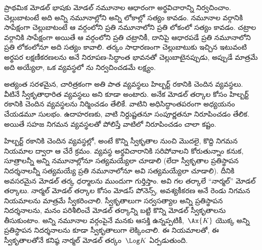 \documentclass[../../../include/open-logic-section]{subfiles}
\begin{document}


ప్రాథమిక మోడల్ భాషకు మోడల్ నమూనాల ఆధారంగా అర్థవిచారాన్ని
నిర్వచించాం.  చెల్లుబాటంటే అది అన్ని
నమూనాల్లోని అన్ని లోకాల్లో సత్యం కావడం. నమూనాల వర్గానికి సాపేక్షంగా
చెల్లుబాటంటే ఆ వర్గంలోని ప్రతి నమూనాలోని ప్రతి లోకంలో సత్యం కావడం.
చట్రాల వర్గానికి సాపేక్షంగా అయితే ఆ వర్గంలోని ప్రతి చట్రానికీ,
దానిపై ఆధారపడే ప్రతి నమూనాలోని ప్రతి లోకంలోనూ అది సత్యం కావాలి.
తర్కం సాధారణంగా చెల్లుబాటుకు ఇచ్చిన ఇటువంటి అర్థపర లక్షణీకరణలను
 అనే నిరూపణ-సిద్ధాంత భావనతో
 చెల్లుబాటైనప్పుడు, అప్పుడే మాత్రమే
అది  అయ్యేలా, ఒక వ్యవస్థలో
ను నిర్వచించడమే లక్ష్యం.

అత్యంత సరళమైన, చారిత్రకంగా అతి పాత 
వ్యవస్థలు హిల్బర్ట్ రకానికి చెందిన  వ్యవస్థలు. వీటినే
స్వీకృతాధారిత వ్యవస్థలు అని కూడా అంటారు. అనేక మోడల్ తర్కాల కోసం హిల్బర్ట్ రకానికి చెందిన
 వ్యవస్థలను నిర్మించడం తేలికే.
వాటిని అధిసిద్ధాంతపరంగా అధ్యయనం చేయడమూ సులభం. ఉదాహరణకు,
వాటి నిర్దుష్టతనూ సంపూర్ణతనూ నిరూపించడం తేలిక. అయితే సహజ నిగమన
వ్యవస్థలతో పోలిస్తే వాటిలో 
నిరూపించడం చాలా కష్టం.

హిల్బర్ట్ రకానికి చెందిన  వ్యవస్థల్లో,
 
అంటే కొన్ని స్వీకృతాల నుంచి మొదలై, కొద్ది నిగమన నియమాల ద్వారా
ఆ  చేరే 
క్రమం.  వ్యవస్థ అర్థవిచారానికి
సరిపోవాలని కోరుతున్నాం కనుక, 
సూత్రాలన్నీ అన్ని నమూనాల్లోనూ సత్యమయ్యేలా చూడాలి
(లేదా స్వీకృతాల ప్రతిస్థాపన నిదర్శనాలన్నీ సత్యమయ్యే ప్రతి నమూనాలోనూ
అవి సత్యమయ్యేలా చూడాలి). దీనికి అవసరమైన మోడల్ తర్క ధర్మాలను ముందుగా
గుర్తిస్తాం. అవి గల తర్కాలే ``నార్మల్'' మోడల్ తర్కాలు. నార్మల్ మోడల్ తర్కాల కోసం
మోడస్ పోనెన్స్, అవశ్యకీకరణ అనే రెండు నిగమన నియమాలను మాత్రమే
స్వీకరించాలి. స్వీకృతాలుగా సర్వసత్యాల అన్ని ప్రతిస్థాపన
నిదర్శనాలను, మనం పరిశీలించే మోడల్ తర్కాన్ని బట్టి కొన్ని మోడల్
స్వీకృతాలను తీసుకుంటాం. అన్ని నమూనాల వర్గంపైనే మనకు ఆసక్తి
ఉన్నప్పటికీ,~$\Ax{K}$ యొక్క
అన్ని ప్రతిస్థాపన నిదర్శనాలను కూడా స్వీకృతాలుగా లెక్కించాలి.
ఈ నియమాలతో, ఈ స్వీకృతాలతోనే కనిష్ఠ నార్మల్ మోడల్
తర్కం~$\Log K$ ఏర్పడుతుంది.
\end{document}
